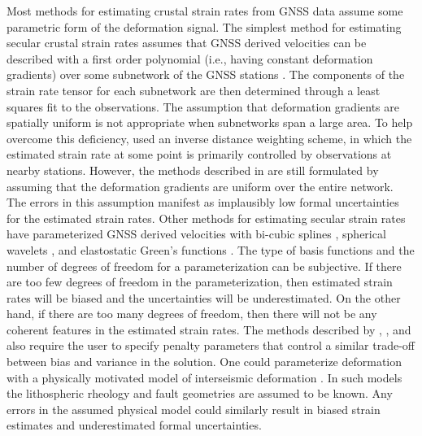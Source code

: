\documentclass[10pt,letter]{article}
\begin{document}
Most methods for estimating crustal strain rates from GNSS data assume some parametric form of the deformation signal. The simplest method for estimating secular crustal strain rates assumes that GNSS derived velocities can be described with a first order polynomial (i.e., having constant deformation gradients) over some subnetwork of the GNSS stations \citep[e.g.,][]{Feigl1990,Murray2000}. The components of the strain rate tensor  for each subnetwork are then determined through a least squares fit to the observations. The assumption that deformation gradients are spatially uniform is not appropriate when subnetworks span a large area.  To help overcome this deficiency, \citet{Shen1996,Shen2015} used an inverse distance weighting scheme, in which the estimated strain rate at some point is primarily controlled by observations at nearby stations. However, the methods described in \citet{Shen1996,Shen2015} are still formulated by assuming that the deformation gradients are uniform over the entire network. The errors in this assumption manifest as implausibly low formal uncertainties for the estimated strain rates. Other methods for estimating secular strain rates have parameterized GNSS derived velocities with bi-cubic splines \citep{Beavan2001}, spherical wavelets \citep{Tape2009}, and elastostatic Green's functions \citep{Sandwell2016}. The type of basis functions and the number of degrees of freedom for a parameterization can be subjective. If there are too few degrees of freedom in the parameterization, then estimated strain rates will be biased and the uncertainties will be underestimated. On the other hand, if there are too many degrees of freedom, then there will not be any coherent features in the estimated strain rates. The methods described by \citet{Beavan2001}, \citet{Tape2009}, and \citet{Sandwell2016} also require the user to specify penalty parameters that control a similar trade-off between bias and variance in the solution. One could parameterize deformation with a physically motivated model of interseismic deformation \citep[e.g.,][]{Meade2005,McCaffrey2007}. In such models the lithospheric rheology and fault geometries are assumed to be known. Any errors in the assumed physical model could similarly result in biased strain estimates and underestimated formal uncertainties. 
\end{document}
